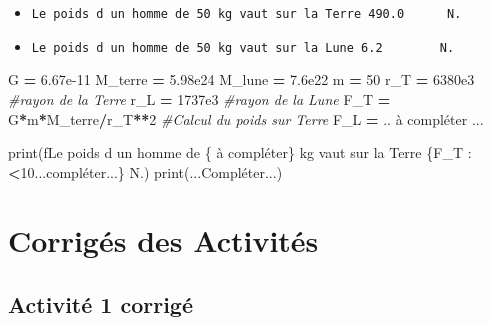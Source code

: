 \documentclass[
]{book}
\newenvironment{Shaded}{\begin{snugshade}}{\end{snugshade}}
\newcommand{\BuiltInTok}[1]{#1}
\newcommand{\CommentTok}[1]{\textcolor[rgb]{0.56,0.35,0.01}{\textit{#1}}}
\newcommand{\DecValTok}[1]{\textcolor[rgb]{0.00,0.00,0.81}{#1}}
\newcommand{\FloatTok}[1]{\textcolor[rgb]{0.00,0.00,0.81}{#1}}
\newcommand{\NormalTok}[1]{#1}
\newcommand{\OperatorTok}[1]{\textcolor[rgb]{0.81,0.36,0.00}{\textbf{#1}}}
\newcommand{\SpecialCharTok}[1]{\textcolor[rgb]{0.00,0.00,0.00}{#1}}
\newcommand{\SpecialStringTok}[1]{\textcolor[rgb]{0.31,0.60,0.02}{#1}}
\providecommand{\tightlist}{%
  \setlength{\itemsep}{0pt}\setlength{\parskip}{0pt}}
\def\tightlist{}
\begin{document}
\begin{itemize}
\tightlist
\item
  \texttt{Le\ poids\ d\ un\ homme\ de\ 50\ kg\ vaut\ sur\ la\ Terre\ 490.0\ \ \ \ \ \ N.}
\item
  \texttt{Le\ poids\ d\ un\ homme\ de\ 50\ kg\ vaut\ sur\ la\ Lune\ 6.2\ \ \ \ \ \ \ \ N.}
\end{itemize}

\begin{Shaded}
\begin{Highlighting}[]
\NormalTok{G }\OperatorTok{=} \FloatTok{6.67e{-}11}
\NormalTok{M\_terre }\OperatorTok{=} \FloatTok{5.98e24}
\NormalTok{M\_lune }\OperatorTok{=} \FloatTok{7.6e22}
\NormalTok{m }\OperatorTok{=} \DecValTok{50}
\NormalTok{r\_T }\OperatorTok{=} \FloatTok{6380e3} \CommentTok{\#rayon de la Terre }
\NormalTok{r\_L }\OperatorTok{=} \FloatTok{1737e3} \CommentTok{\#rayon de la Lune }
\NormalTok{F\_T }\OperatorTok{=}\NormalTok{ G}\OperatorTok{*}\NormalTok{m}\OperatorTok{*}\NormalTok{M\_terre}\OperatorTok{/}\NormalTok{r\_T}\OperatorTok{**}\DecValTok{2} \CommentTok{\#Calcul du poids sur Terre}
\NormalTok{F\_L }\OperatorTok{=}\NormalTok{ .. à compléter ... }

\BuiltInTok{print}\NormalTok{(}\SpecialStringTok{f\textquotesingle{}Le poids d un homme de }\SpecialCharTok{\{} \SpecialCharTok{à}\NormalTok{ compl}\SpecialCharTok{é}\NormalTok{ter}\SpecialCharTok{\}}\SpecialStringTok{ kg vaut sur la Terre }\SpecialCharTok{\{}\NormalTok{F\_T }\SpecialCharTok{:} \OperatorTok{\textless{}}\FloatTok{10.}\SpecialCharTok{..}\NormalTok{compl}\SpecialCharTok{é}\NormalTok{ter}\SpecialCharTok{...\}}\SpecialStringTok{ N.\textquotesingle{}}\NormalTok{)}
\BuiltInTok{print}\NormalTok{(...Compléter...)}
\end{Highlighting}
\end{Shaded}

\newpage

\hypertarget{corriguxe9s-des-activituxe9s}{%
\section{Corrigés des Activités}\label{corriguxe9s-des-activituxe9s}}

\hypertarget{activituxe9-1-corriguxe9}{%
\subsection{Activité 1 corrigé}\label{activituxe9-1-corriguxe9}}
\end{document}
